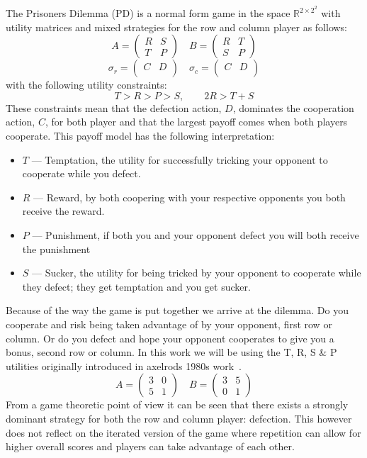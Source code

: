 The Prisoners Dilemma (PD) is a normal form game in the space $\mathbb{R}^{{2\times 2}^2}$ with utility matrices and mixed strategies for the row and column player as follows:
$$
    A=\begin{pmatrix}R & S\\ T & P\end{pmatrix}\quad
    B=\begin{pmatrix}R & T\\ S & P\end{pmatrix}
$$
$$
    \sigma_r=\begin{pmatrix}C & D\\ \end{pmatrix}\quad
    \sigma_c=\begin{pmatrix}C & D\\ \end{pmatrix}
$$
with the following utility constraints:
$$T>R>P>S, \qquad 2R>T+S$$
These constraints mean that the defection action, $D$, dominates the cooperation action, $C$, for both player and that the largest payoff comes when both players cooperate. This payoff model has the following interpretation:
\begin{itemize}
    \item $T$ --- Temptation, the utility for successfully tricking your opponent to cooperate while you defect.
    \item $R$ --- Reward, by both coopering with your respective opponents you both receive the reward.
    \item $P$ --- Punishment, if both you and your opponent defect you will both receive the punishment
    \item $S$ --- Sucker, the utility for being tricked by your opponent to cooperate while they defect; they get temptation and you get sucker.
\end{itemize}
Because of the way the game is put together we arrive at the dilemma.
Do you cooperate and risk being taken advantage of by your opponent, first row or column.
Or do you defect and hope your opponent cooperates to give you a bonus, second row or column.
In this work we will be using the T, R, S \& P utilities originally introduced in axelrods 1980s work~\cite{axelrod1980effective}.
$$
    A=\begin{pmatrix}3 & 0 \\ 5 & 1\end{pmatrix}\quad
    B=\begin{pmatrix}3 & 5 \\ 0 & 1\end{pmatrix}
$$    
From a game theoretic point of view it can be seen that there exists a strongly dominant strategy for both the row and column player: defection.
This however does not reflect on the iterated version of the game where repetition can allow for higher overall scores and players can take advantage of each other.


